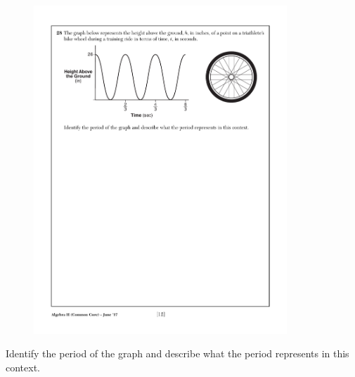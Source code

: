 \vspace{0.5 in}
\begin{figure}[!ht]
    \centering
    \includegraphics[width=0.85\textwidth]{sine-bike-wheel.pdf}
\end{figure}

Identify the period of the graph and describe what the period represents in this context.